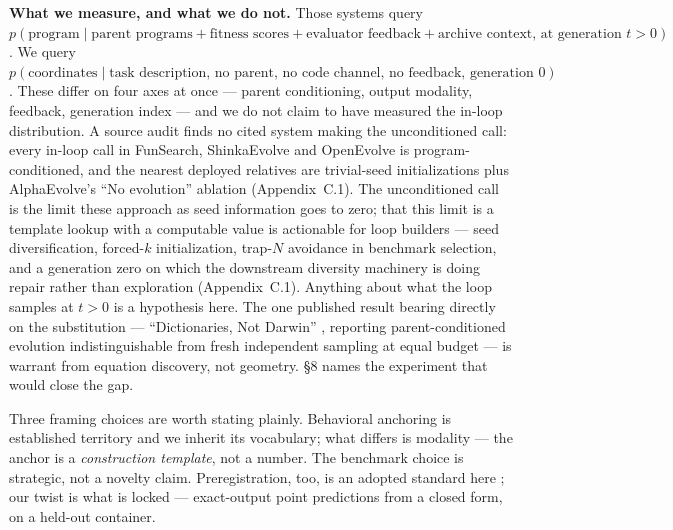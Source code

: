 \textbf{What we measure, and what we do not.} Those systems query $p(\text{program} \mid \text{parent programs} +
\text{fitness scores} + \text{evaluator feedback} + \text{archive context, at generation } t > 0)$. We query
$p(\text{coordinates} \mid \text{task description, no parent, no code channel, no feedback, generation 0})$. These
differ on four axes at once --- parent conditioning, output modality, feedback, generation index
--- and we do not claim to have measured the in-loop distribution. A source audit finds no cited
system making the unconditioned call: every in-loop call in FunSearch, ShinkaEvolve and OpenEvolve
is program-conditioned, and the nearest deployed relatives are trivial-seed initializations plus
AlphaEvolve's ``No evolution'' ablation (Appendix~C.1). The unconditioned call is the limit these
approach as seed information goes to zero; that this limit is a template lookup with a computable
value is actionable for loop builders --- seed diversification, forced-$k$ initialization, trap-$N$
avoidance in benchmark selection, and a generation zero on which the downstream diversity machinery
\citep{mouret2015mapelites,lehman2011novelty} is doing repair rather than exploration
(Appendix~C.1). Anything about what the loop samples at $t > 0$ is a hypothesis here. The one
published result bearing directly on the substitution --- ``Dictionaries, Not Darwin''
\citep{li2026dictionariesdarwinsetlevelselection}, reporting parent-conditioned evolution
indistinguishable from fresh independent sampling at equal budget --- is warrant from equation
discovery, not geometry. \S8 names the experiment that would close the gap.

Three framing choices are worth stating plainly. Behavioral anchoring is established territory
\citep{huang2026understandinganchoringeffectllm,lou2024anchoringbiaslargelanguage,malberg2025comprehensiveevaluationcognitivebiases}
and we inherit its vocabulary; what differs is modality --- the anchor is a \emph{construction
template}, not a number. The benchmark choice is strategic, not a novelty claim. Preregistration,
too, is an adopted standard here
\citep{thomas2026mitigatingllmbasedphackingpreregistering,williams2026predictingllmsafetyrelease,vaccaro2026preregistrationexperimentsaiagents,zhang2026testingfrontierlargelanguage};
our twist is what is locked --- exact-output point predictions from a closed form, on a held-out
container.

